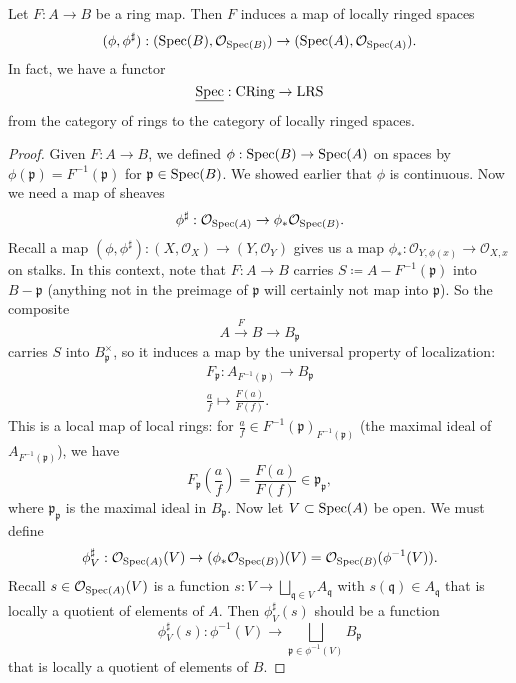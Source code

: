 \documentclass[12pt]{article}
\begin{document}
\begin{proposition}
	Let $F:A\to B$ be a ring map. Then $F$ induces a map of locally ringed spaces 
	\begin{equation*}
		(\phi,\phi^\sharp): (\text{Spec}(B), \mathcal{O}_{\text{Spec}(B)}) \to (\text{Spec}(A), \mathcal{O}_{\text{Spec}(A)}).
	\end{equation*}
	In fact, we have a functor 
	\begin{equation*}
		\underline{\text{Spec}}: \text{CRing} \to \text{LRS}
	\end{equation*}
	from the category of rings to the category of locally ringed spaces.
\end{proposition}
\begin{proof}
	Given $F:A\to B$, we defined $\phi:\text{Spec}(B)\to\text{Spec}(A)$ on spaces by $\phi(\mathfrak{p})=F^{-1}(\mathfrak{p})$ for $\mathfrak{p}\in\text{Spec}(B)$. We showed earlier that $\phi$ is continuous. Now we need a map of sheaves 
	\begin{equation*}
		\phi^\sharp: \mathcal{O}_{\text{Spec}(A)} \to \phi_\ast\mathcal{O}_{\text{Spec}(B)}.
	\end{equation*}
	Recall a map $(\phi,\phi^\sharp):(X,\mathcal{O}_X)\to (Y,\mathcal{O}_Y)$ gives us a map $\phi_\ast: \mathcal{O}_{Y,\phi(x)}\to\mathcal{O}_{X,x}$ on stalks. In this context, note that $F:A\to B$ carries $S\coloneqq A-F^{-1}(\mathfrak{p})$ into $B-\mathfrak{p}$ (anything not in the preimage of $\mathfrak{p}$ will certainly not map into $\mathfrak{p}$). So the composite 
	\begin{equation*}
		A \overset{F}{\to} B \to B_\mathfrak{p}
	\end{equation*}
	carries $S$ into $B_\mathfrak{p}^\times$, so it induces a map by the universal property of localization:
	\begin{gather*}
		F_\mathfrak{p}: A_{F^{-1}(\mathfrak{p})} \to B_\mathfrak{p} \\
		\frac{a}{f} \mapsto \frac{F(a)}{F(f)}.
	\end{gather*}
	This is a local map of local rings: for $\frac{a}{f}\in F^{-1}(\mathfrak{p})_{F^{-1}(\mathfrak{p})}$ (the maximal ideal of $A_{F^{-1}(\mathfrak{p})}$), we have 
	\begin{equation*}
		F_\mathfrak{p}(\frac{a}{f}) = \frac{F(a)}{F(f)} \in \mathfrak{p}_\mathfrak{p},
	\end{equation*}
	where $\mathfrak{p}_\mathfrak{p}$ is the maximal ideal in $B_\mathfrak{p}$. Now let $V\subset\text{Spec}(A)$ be open. We must define 
	\begin{equation*}
		\phi^\sharp_V: \mathcal{O}_{\text{Spec}(A)}(V) \to (\phi_\ast\mathcal{O}_{\text{Spec}(B)})(V)=\mathcal{O}_{\text{Spec}(B)}(\phi^{-1}(V)).
	\end{equation*}
	Recall $s\in\mathcal{O}_{\text{Spec}(A)}(V)$ is a function $s:V\to\bigsqcup_{\mathfrak{q}\in V}A_\mathfrak{q}$ with $s(\mathfrak{q})\in A_\mathfrak{q}$ that is locally a quotient of elements of $A$. Then $\phi^\sharp_V(s)$ should be a function 
	\begin{equation*}
		\phi^\sharp_V(s):\phi^{-1}(V) \to \bigsqcup_{\mathfrak{p}\in\phi^{-1}(V)}B_\mathfrak{p}
	\end{equation*}
	that is locally a quotient of elements of $B$. 


\end{proof}
\end{document}
